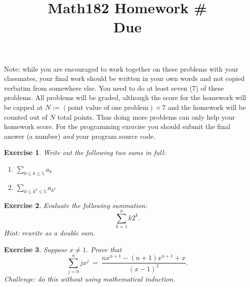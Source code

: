 \documentclass[11pt]{amsart}
\title{Math182 Homework \#\homeworknumber
\\ Due \duedate}
\theoremstyle{theorem}
\newtheorem{exercise}{Exercise}
\begin{document}
\maketitle


Note: while you are encouraged to work together on these problems with your classmates, your final work should be written in your own words and not copied verbatim from somewhere else. You need to do at least seven (7) of these problems. All problems will be graded, although the score for the homework will be capped at $N:=(\text{point value of one problem})\times 7$ and the homework will be counted out of $N$ total points. Thus doing more problems can only help your homework score. For the programming exercise you should submit the final answer (a number) \emph{and} your program source code.

\begin{exercise}
Write out the following two sums in full:
\begin{enumerate}
\item $\sum_{0\leq k\leq 5}a_k$
\item $\sum_{0\leq k^2\leq 5}a_{k^2}$
\end{enumerate}
\end{exercise}

\begin{exercise}
Evaluate the following summation:
\[
\sum_{k=1}^nk2^k.
\]
Hint: rewrite as a double sum.
\end{exercise}

\begin{exercise}
Suppose $x\neq 1$. Prove that
\[
\sum_{j=0}^n jx^j \ = \ \frac{nx^{n+1}-(n+1)x^{n+1}+x}{(x-1)^2}.
\]
Challenge: do this \emph{without} using mathematical induction.
\end{exercise}
\end{document}
